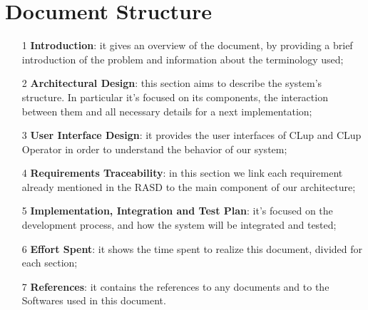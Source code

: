 \section{Document Structure}
\begin{itemize}
\item[1]\textbf{Introduction}: it gives an overview of the document, by providing a brief introduction of the problem and information about the terminology used;
\item[2]\textbf{Architectural Design}: this section aims to describe the system’s structure. In particular it's focused on its components, the interaction between them and all necessary details for a next implementation; 
\item[3]\textbf{User Interface Design}: it provides the user interfaces of CLup and CLup Operator in order to understand the behavior of our system; 
\item[4]\textbf{Requirements Traceability}: in this section we link each requirement already mentioned in the RASD to the main component of our architecture;
\item[5]\textbf{Implementation, Integration and Test Plan}: it's focused on the development process, and how the system will be integrated and tested;
\item[6]\textbf{Effort Spent}: it shows the time spent to realize this document, divided for each section;
\item[7]\textbf{References}: it contains the references to any documents and to the Softwares used in this document.
\end{itemize}


